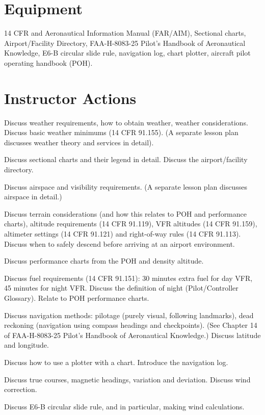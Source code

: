 \section{Equipment}

14 CFR and Aeronautical Information Manual (FAR/AIM), Sectional charts,
Airport/Facility Directory, FAA-H-8083-25 Pilot's Handbook of Aeronautical
Knowledge, E6-B circular slide rule, navigation log, chart plotter, aircraft
pilot operating handbook (POH).

\section{Instructor Actions}

Discuss weather requirements, how to obtain weather, weather considerations.
Discuss basic weather minimums (14 CFR 91.155). (A separate lesson plan
discusses weather theory and services in detail).

Discuss sectional charts and their legend in detail. Discuss the
airport/facility directory.

Discuss airspace and visibility requirements. (A separate lesson plan discusses
airspace in detail.)

Discuss terrain considerations (and how this relates to POH and performance
charts), altitude requirements (14 CFR 91.119), VFR altitudes (14 CFR 91.159),
altimeter settings (14 CFR 91.121) and right-of-way rules (14 CFR 91.113).
Discuss when to safely descend before arriving at an airport environment.

Discuss performance charts from the POH and density altitude.

Discuss fuel requirements (14 CFR 91.151): 30 minutes extra fuel for day VFR,
45 minutes for night VFR. Discuss the definition of night (Pilot/Controller
Glossary). Relate to POH performance charts.

Discuss navigation methods: pilotage (purely visual, following landmarks), dead
reckoning (navigation using compass headings and checkpoints). (See Chapter 14
of FAA-H-8083-25 Pilot's Handbook of Aeronautical Knowledge.) Discuss latitude
and longitude.

Discuss how to use a plotter with a chart. Introduce the navigation log.

Discuss true courses, magnetic headings, variation and deviation. Discuss wind
correction.

Discuss E6-B circular slide rule, and in particular, making wind calculations.

